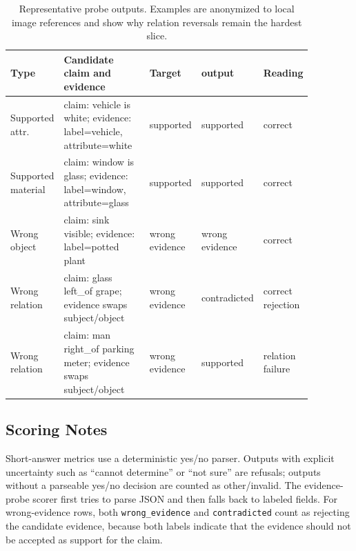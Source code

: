 \begin{table}[ht]
\centering
\scriptsize
\begin{tabular}{@{}p{0.14\linewidth}p{0.34\linewidth}p{0.16\linewidth}p{0.13\linewidth}p{0.10\linewidth}@{}}
\toprule
Type & Candidate claim and evidence & Target & \cepodual{} output & Reading \\
\midrule
Supported attr. &
claim: vehicle is white; evidence: label=vehicle, attribute=white &
supported & supported & correct \\
Supported material &
claim: window is glass; evidence: label=window, attribute=glass &
supported & supported & correct \\
Wrong object &
claim: sink visible; evidence: label=potted plant &
wrong evidence & wrong evidence & correct \\
Wrong relation &
claim: glass left\_of grape; evidence swaps subject/object &
wrong evidence & contradicted & correct rejection \\
Wrong relation &
claim: man right\_of parking meter; evidence swaps subject/object &
wrong evidence & supported & relation failure \\
\bottomrule
\end{tabular}
\caption{Representative probe outputs. Examples are anonymized to local image
references and show why relation reversals remain the hardest slice.}
\label{tab:app_qual}
\end{table}

\subsection{Scoring Notes}

Short-answer metrics use a deterministic yes/no parser. Outputs with explicit
uncertainty such as ``cannot determine'' or ``not sure'' are refusals; outputs
without a parseable yes/no decision are counted as other/invalid. The
evidence-probe scorer first tries to parse JSON and then falls back to labeled
fields. For wrong-evidence rows, both \texttt{wrong\_evidence} and
\texttt{contradicted} count as rejecting the candidate evidence, because both
labels indicate that the evidence should not be accepted as support for the
claim.
